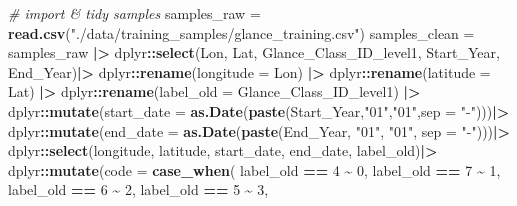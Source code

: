 \documentclass[
]{article}
\newenvironment{Shaded}{\begin{snugshade}}{\end{snugshade}}
\newcommand{\AttributeTok}[1]{\textcolor[rgb]{0.13,0.29,0.53}{#1}}
\newcommand{\CommentTok}[1]{\textcolor[rgb]{0.56,0.35,0.01}{\textit{#1}}}
\newcommand{\DecValTok}[1]{\textcolor[rgb]{0.00,0.00,0.81}{#1}}
\newcommand{\FunctionTok}[1]{\textcolor[rgb]{0.13,0.29,0.53}{\textbf{#1}}}
\newcommand{\NormalTok}[1]{#1}
\newcommand{\OtherTok}[1]{\textcolor[rgb]{0.56,0.35,0.01}{#1}}
\newcommand{\SpecialCharTok}[1]{\textcolor[rgb]{0.81,0.36,0.00}{\textbf{#1}}}
\newcommand{\StringTok}[1]{\textcolor[rgb]{0.31,0.60,0.02}{#1}}
\begin{document}
\begin{Shaded}
\begin{Highlighting}[]
\CommentTok{\# import \& tidy samples}
\NormalTok{samples\_raw }\OtherTok{=} \FunctionTok{read.csv}\NormalTok{(}\StringTok{"./data/training\_samples/glance\_training.csv"}\NormalTok{)}
\NormalTok{samples\_clean }\OtherTok{=}\NormalTok{ samples\_raw }\SpecialCharTok{|\textgreater{}}
\NormalTok{  dplyr}\SpecialCharTok{::}\FunctionTok{select}\NormalTok{(Lon, Lat, Glance\_Class\_ID\_level1, Start\_Year, End\_Year)}\SpecialCharTok{|\textgreater{}}
\NormalTok{  dplyr}\SpecialCharTok{::}\FunctionTok{rename}\NormalTok{(}\AttributeTok{longitude =}\NormalTok{ Lon) }\SpecialCharTok{|\textgreater{}}
\NormalTok{  dplyr}\SpecialCharTok{::}\FunctionTok{rename}\NormalTok{(}\AttributeTok{latitude =}\NormalTok{ Lat) }\SpecialCharTok{|\textgreater{}}
\NormalTok{  dplyr}\SpecialCharTok{::}\FunctionTok{rename}\NormalTok{(}\AttributeTok{label\_old =}\NormalTok{ Glance\_Class\_ID\_level1) }\SpecialCharTok{|\textgreater{}}
\NormalTok{  dplyr}\SpecialCharTok{::}\FunctionTok{mutate}\NormalTok{(}\AttributeTok{start\_date =} \FunctionTok{as.Date}\NormalTok{(}\FunctionTok{paste}\NormalTok{(Start\_Year,}\StringTok{"01"}\NormalTok{,}\StringTok{"01"}\NormalTok{,}\AttributeTok{sep =} \StringTok{"{-}"}\NormalTok{)))}\SpecialCharTok{|\textgreater{}}
\NormalTok{  dplyr}\SpecialCharTok{::}\FunctionTok{mutate}\NormalTok{(}\AttributeTok{end\_date =} \FunctionTok{as.Date}\NormalTok{(}\FunctionTok{paste}\NormalTok{(End\_Year, }\StringTok{"01"}\NormalTok{, }\StringTok{"01"}\NormalTok{, }\AttributeTok{sep =} \StringTok{"{-}"}\NormalTok{)))}\SpecialCharTok{|\textgreater{}}
\NormalTok{  dplyr}\SpecialCharTok{::}\FunctionTok{select}\NormalTok{(longitude, latitude, start\_date, end\_date, label\_old)}\SpecialCharTok{|\textgreater{}}
\NormalTok{  dplyr}\SpecialCharTok{::}\FunctionTok{mutate}\NormalTok{(}\AttributeTok{code =} \FunctionTok{case\_when}\NormalTok{(}
\NormalTok{    label\_old }\SpecialCharTok{==} \StringTok{\textquotesingle{}4\textquotesingle{}} \SpecialCharTok{\textasciitilde{}} \DecValTok{0}\NormalTok{, }
\NormalTok{    label\_old }\SpecialCharTok{==} \StringTok{\textquotesingle{}7\textquotesingle{}} \SpecialCharTok{\textasciitilde{}} \DecValTok{1}\NormalTok{, }
\NormalTok{    label\_old }\SpecialCharTok{==} \StringTok{\textquotesingle{}6\textquotesingle{}} \SpecialCharTok{\textasciitilde{}} \DecValTok{2}\NormalTok{, }
\NormalTok{    label\_old }\SpecialCharTok{==} \StringTok{\textquotesingle{}5\textquotesingle{}} \SpecialCharTok{\textasciitilde{}} \DecValTok{3}\NormalTok{, }

\end{Highlighting}
\end{Shaded}
\end{document}
